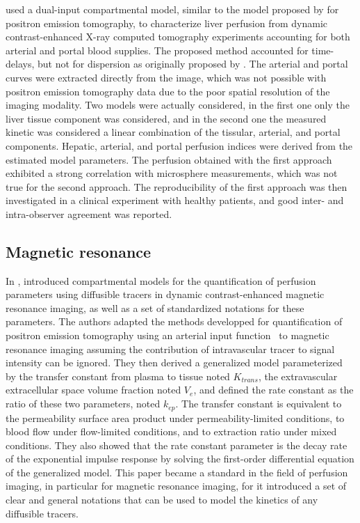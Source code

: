 \citet{Materne:2000gu} used a dual-input compartmental model, similar to the model proposed by \citet{Ziegler:1996cs} for positron emission tomography, to characterize liver perfusion from dynamic contrast-enhanced X-ray computed tomography experiments accounting for both arterial and portal blood supplies.
The proposed method accounted for time-delays, but not for dispersion as originally proposed by \citet{Ziegler:1996cs}. 
The arterial and portal curves were extracted directly from the image, which was not possible with positron emission tomography data due to the poor spatial resolution of the imaging modality.
Two models were actually considered, in the first one only the liver tissue component was considered, and in the second one the measured kinetic was considered a linear combination of the tissular, arterial, and portal components.
Hepatic, arterial, and portal perfusion indices were derived from the estimated model parameters.
The perfusion obtained with the first approach exhibited a strong correlation with microsphere measurements, which was not true for the second approach.
The reproducibility of the first approach was then investigated in a clinical experiment with healthy patients, and good inter- and intra-observer agreement was reported.

\subsection{Magnetic resonance}
In \citeyear{Tofts:1999ih}, \citet{Tofts:1999ih} introduced compartmental models for the quantification of perfusion parameters using diffusible tracers in dynamic contrast-enhanced magnetic resonance imaging, as well as a set of standardized notations for these parameters.
The authors adapted the methods developped for quantification of positron emission tomography using an arterial input function~\cite{Kety:1951tp,Renkin:1959te,Crone:1963cz} to magnetic resonance imaging assuming the contribution of intravascular tracer to signal intensity can be ignored.
They then derived a generalized model parameterized by the transfer constant from plasma to tissue noted $K_{trans}$, the extravascular extracellular space volume fraction noted $V_{e}$, and defined the rate constant as the ratio of these two parameters, noted $k_{ep}$.
The transfer constant is equivalent to the permeability surface area product under permeability-limited conditions, to blood flow under flow-limited conditions, and to extraction ratio under mixed conditions.
They also showed that the rate constant parameter is the decay rate of the exponential impulse response by solving the first-order differential equation of the generalized model.
This paper became a standard in the field of perfusion imaging, in particular for magnetic resonance imaging, for it introduced a set of clear and general notations that can be used to model the kinetics of any diffusible tracers.

